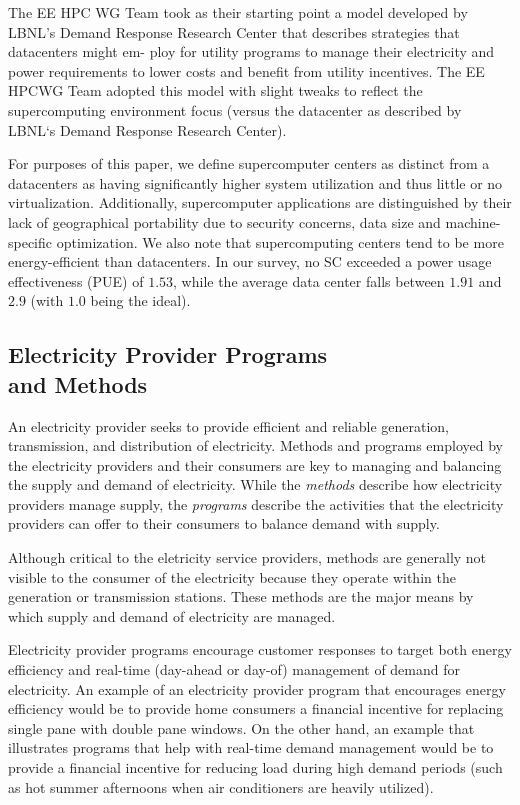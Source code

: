 The EE HPC WG Team took as their starting point a
model developed by LBNL's Demand Response Research
Center that describes strategies that datacenters might em-
ploy for utility programs to manage their electricity and
power requirements to lower costs and benefit from utility
incentives. The EE HPCWG Team adopted this model with
slight tweaks to reflect the supercomputing environment
focus (versus the datacenter as described by LBNL`s Demand
Response Research Center).

For purposes of this paper, we define supercomputer centers
as distinct from a datacenters as having 
significantly higher system utilization and thus little or no 
virtualization.  Additionally, supercomputer
applications are distinguished by their lack of geographical
portability due to security concerns, data size and machine-specific
optimization.  We also note  that supercomputing centers tend to be more
energy-efficient than datacenters.  
In our survey, no SC exceeded a power usage effectiveness (PUE) of $1.53$,
while the average data center falls between $1.91$ and $2.9$ (with $1.0$ being
the ideal).~\cite{FIXME}

\subsection{Electricity Provider Programs\\
and Methods}
\label{sub:EPP}
An electricity provider seeks to provide efficient and reliable generation, transmission, and 
distribution of electricity. Methods and programs employed by the electricity providers and their consumers 
are key to managing and balancing the supply and demand of electricity. While the \textit{methods} 
describe how 
electricity providers manage supply, the \textit{programs} describe the activities that 
the electricity providers 
can offer to their consumers to balance demand with supply.

Although critical to the eletricity service providers, methods 
are generally not visible to the consumer of the electricity because they
operate within the generation  or transmission stations.
These methods are the major means by which supply and demand of electricity are managed.

Electricity provider programs encourage customer responses to target both energy efficiency and real-time
(day-ahead or day-of) management of demand for electricity. An example of an electricity provider program 
that encourages energy efficiency would be to provide home consumers a financial incentive for replacing 
single pane with double pane windows.  On the other hand, an example that illustrates programs that help 
with real-time demand management would be to provide a financial incentive for reducing load 
during high demand periods 
(such as hot summer afternoons when air conditioners are heavily utilized). 

